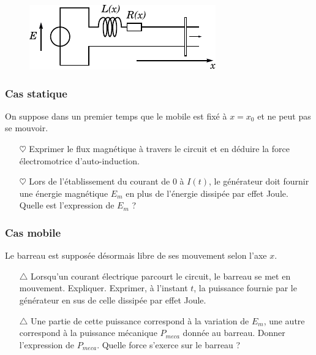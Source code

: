 \documentclass{report}
\begin{document}
\begin{figure}[h!]
\centering
		\includegraphics[scale=1]{induction1.pdf}
\end{figure}

\subsubsection*{Cas statique}

On suppose dans un premier temps que le mobile est fixé à $x=x_0$ et ne peut pas se mouvoir. 

\begin{itemize}

	\item[$\heartsuit$] Exprimer le flux magnétique à travers le circuit et en déduire la force électromotrice d'auto-induction.
	
	\item[$\heartsuit$] Lors de l'établissement du courant de 0 à $I(t)$, le générateur doit fournir une énergie magnétique $E_m$ en plus de l'énergie dissipée par effet Joule. Quelle est l'expression de $E_m$ ?

\end{itemize}

\subsubsection*{Cas mobile}

Le barreau est supposée désormais libre de ses mouvement selon l'axe $x$. 

\begin{itemize}

	\item[$\triangle$] Lorsqu'un courant électrique parcourt le circuit, le barreau se met en mouvement. Expliquer. Exprimer, à l'instant $t$, la puissance fournie par le générateur en sus de celle dissipée par effet Joule. 
	
	\item[$\triangle$] Une partie de cette puissance correspond à la variation de $E_m$, une autre correspond à la puissance mécanique $P_{meca}$ donnée au barreau. Donner l'expression de $P_{meca}$. Quelle force s'exerce sur le barreau ?

\end{itemize}
\end{document}

